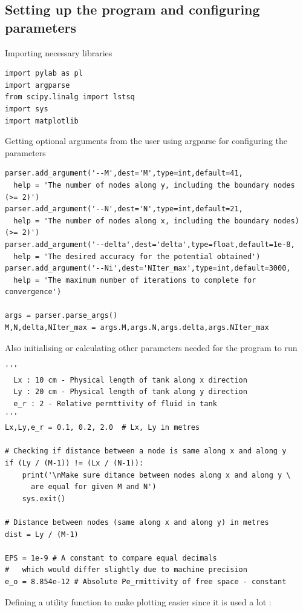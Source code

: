 \documentclass[11pt, a4paper]{article}
\begin{document}
\subsection{Setting up the program and configuring parameters}
Importing necessary libraries
\begin{verbatim}
import pylab as pl
import argparse
from scipy.linalg import lstsq
import sys
import matplotlib
\end{verbatim}
Getting optional arguments from the user using argparse for configuring the parameters
\begin{verbatim}
parser.add_argument('--M',dest='M',type=int,default=41, 
  help = 'The number of nodes along y, including the boundary nodes (>= 2)')
parser.add_argument('--N',dest='N',type=int,default=21,  
  help = 'The number of nodes along x, including the boundary nodes) (>= 2)')
parser.add_argument('--delta',dest='delta',type=float,default=1e-8, 
  help = 'The desired accuracy for the potential obtained')
parser.add_argument('--Ni',dest='NIter_max',type=int,default=3000, 
  help = 'The maximum number of iterations to complete for convergence')

args = parser.parse_args()
M,N,delta,NIter_max = args.M,args.N,args.delta,args.NIter_max
\end{verbatim}
Also initialising or calculating other parameters needed for the program to run 
\begin{verbatim}
'''
  Lx : 10 cm - Physical length of tank along x direction
  Ly : 20 cm - Physical length of tank along y direction
  e_r : 2 - Relative permttivity of fluid in tank
'''
Lx,Ly,e_r = 0.1, 0.2, 2.0  # Lx, Ly in metres

# Checking if distance between a node is same along x and along y
if (Ly / (M-1)) != (Lx / (N-1)):
    print('\nMake sure ditance between nodes along x and along y \
      are equal for given M and N')
    sys.exit()

# Distance between nodes (same along x and along y) in metres
dist = Ly / (M-1)

EPS = 1e-9 # A constant to compare equal decimals 
#   which would differ slightly due to machine precision
e_o = 8.854e-12 # Absolute Pe_rmittivity of free space - constant
\end{verbatim}
Defining a utility function to make plotting easier since it is used a lot :
\end{document}
